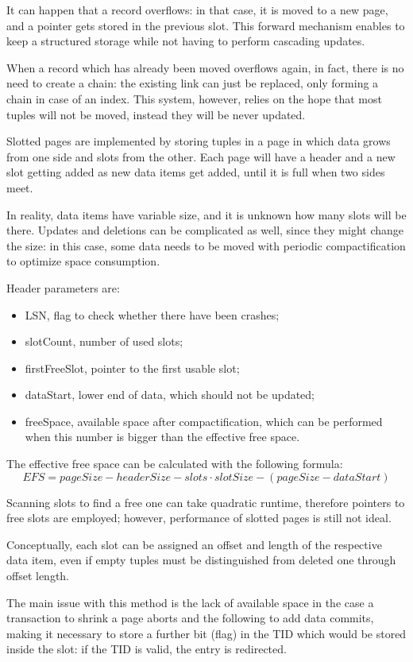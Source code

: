 It can happen that a record overflows: in that case, it is moved to a new page, and a pointer gets stored in the previous slot. This forward mechanism enables to keep a structured storage while not having to perform cascading updates.

When a record which has already been moved overflows again, in fact, there is no need to create a chain: the existing link can just be replaced, only forming a chain in case of an index. This system, however, relies on the hope that most tuples will not be moved, instead they will be never updated. 

Slotted pages are implemented by storing tuples in a page in which data grows from one side and slots from the other. Each page will have a header and a new slot getting added as new data items get added, until it is full when two sides meet.

In reality, data items have variable size, and it is unknown how many slots will be there. Updates and deletions can be complicated as well, since they might change the size: in this case, some data needs to be moved with periodic compactification to optimize space consumption.

Header parameters are:
\begin{itemize}
	\item LSN, flag to check whether there have been crashes;
	\item slotCount, number of used slots;
	\item firstFreeSlot, pointer to the first usable slot;
	\item dataStart, lower end of data, which should not be updated;
	\item freeSpace, available space after compactification, which can be performed when this number is bigger than the effective free space.
\end{itemize}
The effective free space can be calculated with the following formula:
$$EFS = pageSize - headerSize - slots \cdot slotSize - (pageSize - dataStart)$$ 

Scanning slots to find a free one can take quadratic runtime, therefore pointers to free slots are employed; however, performance of slotted pages is still not ideal.

Conceptually, each slot can be assigned an offset and length of the respective data item, even if empty tuples must be distinguished from deleted one through offset length.

The main issue with this method is the lack of available space in the case a transaction to shrink a page aborts and the following to add data commits, making it necessary to store a further bit (flag) in the TID which would be stored inside the slot: if the TID is valid, the entry is redirected.

